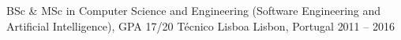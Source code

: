 \vspace{-1.5mm}

\begin{cventries}
  \cventryShort
    {BSc \& MSc in Computer Science and Engineering (Software Engineering and Artificial Intelligence), GPA 17/20}
    {Técnico Lisboa}
    {Lisbon, Portugal}
    {2011 – 2016}
\end{cventries}
